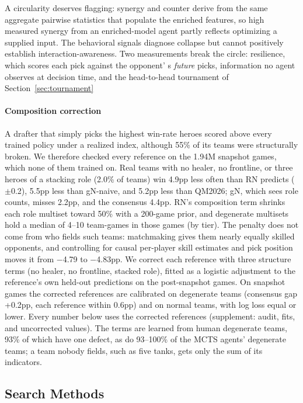 \documentclass[journal]{IEEEtran}
\providecommand{\DIFaddtex}[1]{{\protect\color{blue} \sf #1}} %
\providecommand{\DIFdeltex}[1]{{\protect\color{red} \scriptsize #1}} %
\providecommand{\DIFaddbegin}{} %
\providecommand{\DIFaddend}{} %
\providecommand{\DIFdelend}{} %
\providecommand{\DIFadd}[1]{\texorpdfstring{\DIFaddtex{#1}}{#1}} %
\providecommand{\DIFdel}[1]{\texorpdfstring{\DIFdeltex{#1}}{}} %
\begin{document}
\DIFdel{A circularity deserves flagging: synergy and counter derive from the same aggregate pairwise statistics that populate the enriched features, so high measured synergy from an enriched-model agent partly reflects optimizing a supplied input. The behavioral signals diagnose collapse but cannot positively establish interaction-awareness. Two measurements break the circle: resilience, which scores each pick against the opponent' s \textit{future} picks, information no agent observes at decision time, and the head-to-head tournament of Section~\ref{sec:tournament}}\DIFdelend \DIFaddbegin \paragraph{\DIFadd{Composition correction}} \DIFadd{A drafter that simply picks the highest win-rate heroes scored above every trained policy under a realized index, although 55\% of its teams were structurally broken. We therefore checked every reference on the 1.94M snapshot games, which none of them trained on. Real teams with no healer, no frontline, or three heroes of a stacking role (2.0\% of teams) win 4.9pp less often than RN predicts ($\pm$0.2), 5.5pp less than gN-naive, and 5.2pp less than QM2026; gN, which sees role counts, misses 2.2pp, and the consensus 4.4pp. RN's composition term shrinks each role multiset toward 50\% with a 200-game prior, and degenerate multisets hold a median of 4--10 team-games in those games (by tier). The penalty does not come from who fields such teams: matchmaking gives them nearly equally skilled opponents, and controlling for causal per-player skill estimates and pick position moves it from $-$4.79 to $-$4.83pp. We correct each reference with three structure terms (no healer, no frontline, stacked role), fitted as a logistic adjustment to the reference's own held-out predictions on the post-snapshot games. On snapshot games the corrected references are calibrated on degenerate teams (consensus gap +0.2pp, each reference within 0.6pp) and on normal teams, with log loss equal or lower. Every number below uses the corrected references (supplement: audit, fits, and uncorrected values). The terms are learned from human degenerate teams, 93\% of which have one defect, as do 93--100\% of the MCTS agents' degenerate teams; a team nobody fields, such as five tanks, gets only the sum of its indicators}\DIFaddend .

\subsection{Search Methods}
\end{document}
